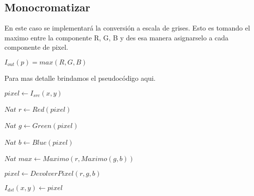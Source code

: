 \subsection{Monocromatizar}

En este caso se implementará la conversión a escala de grises. Esto es tomando el maximo entre la componente R, G, B y des esa manera asignarselo a cada componente de pixel.

\begin{center}
  $I_{out}(p) = max(R, G, B)$
\end{center}

Para mas detalle brindamos el pseudocódigo aqui. 

\begin{algorithm}[H]
  \begin{algorithmic}[1]
			  
			  \STATE $pixel \gets I_{src}(x,y)$
			  
			  \STATE $Nat$ $ r \gets Red(pixel) $
			  
			  \STATE $Nat$ $g \gets Green(pixel)$
			  
			  \STATE $Nat$ $ b \gets Blue(pixel)$
			  
			  \STATE $Nat$ $max \gets Maximo(r, Maximo(g, b))$
			  
			  \STATE $pixel \gets DevolverPixel(r,g,b)$
			
			  \STATE $I_{dst}(x,y) \gets pixel$
			  
			\ENDFOR

		 \ENDFOR

  \end{algorithmic}
  \caption{$monocromatizar (I_{src}, I_{dst})$}
  \label{alg:ondas}
\end{algorithm}
